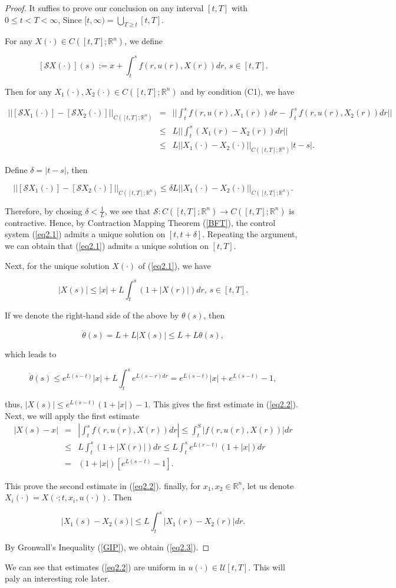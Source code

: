 \begin{proof}
It suffies to prove our conclusion on any interval $[t,T]$ with $0\leq t<T<\infty$, Since $[t,\infty)=\bigcup_{T\geq t}[t,T]$.

For any $X(\cdot)\in C([t,T];\mathbb{R}^n)$, we define

$$[\mathcal{S}X(\cdot)](s):=x+\int_{t}^{s}f(r,u(r),X(r))dr,\,s\in [t,T].$$

Then for any $X_1(\cdot),X_2(\cdot)\in C([t,T];\mathbb{R}^n)$ and by condition (C1), we have

\begin{eqnarray*}
||[\mathcal{S}X_1(\cdot)]-[\mathcal{S}X_2(\cdot)]||_{C([t,T];\mathbb{R}^n)}&=&|| \int_{t}^{s}f(r,u(r),X_1(r))dr-\int_{t}^{s}f(r,u(r),X_2(r))dr||\\
&\leq& L||\int_{t}^{s} (X_1(r)-X_2(r)) dr||\\
&\leq& L||X_1(\cdot)-X_2(\cdot)||_{C([t,T];\mathbb{R}^n)}|t-s|.
\end{eqnarray*}

Define $\delta=|t-s|$, then

$$||[\mathcal{S}X_1(\cdot)]-[\mathcal{S}X_2(\cdot)]||_{C([t,T];\mathbb{R}^n)}\leq \delta L||X_1(\cdot)-X_2(\cdot)||_{C([t,T];\mathbb{R}^n)}.$$

Therefore, by chosing $\delta<\frac{1}{L}$, we see that $\mathcal{S}: C([t,T];\mathbb{R}^n)\rightarrow C([t,T];\mathbb{R}^n)$ is contractive. Hence, by Contraction Mapping Theorem (\ref{BFT}), the control system (\ref{eq2.1}) admits a unique solution on $[t,t+\delta]$. Repeating the argument, we can obtain that (\ref{eq2.1}) admits a unique solution on $[t,T]$.

Next, for the unique solution $X(\cdot)$ of (\ref{eq2.1}), we have

$$|X(s)|\leq |x|+L\int_{t}^{s}(1+|X(r)|)dr,\, s\in [t,T].$$

If we denote the right-hand side of the above by $\theta(s)$, then

$$\dot{\theta}(s)=L+L|X(s)|\leq L+L\theta(s),$$

which leads to 

$$\dot{\theta}(s)\leq e^{L(s-t)}|x|+L\int_{t}^{s}e^{L(s-r)dr}=e^{L(s-t)}|x|+e^{L(s-t)}-1,$$

thus, $|X(s)|\leq e^{L(s-t)}(1+|x|)-1.$ This gives the first estimate in (\ref{eq2.2}). Next, we will apply the first estimate
\begin{eqnarray*}
|X(s)-x| &=& |\int_{t}^{s}f(r,u(r),X(r))dr|\leq \int_{t}^{S}|f(r,u(r),X(r))|dr\\
&\leq& L\int_{t}^{s}(1+|X(r)|)dr\leq L\int_{t}^{s}e^{L(r-t)}(1+|x|)dr\\
&=& (1+|x|)[e^{L(s-t)}-1].
\end{eqnarray*}

This prove the second estimate in (\ref{eq2.2}). finally, for $x_1,x_2\in \mathbb{R}^n$, let us denote $X_i(\cdot)=X(\cdot;t,x_i,u(\cdot))$. Then

$$|X_1(s)-X_2(s)|\leq L\int_{t}^{s} |X_1(r)-X_2(r)|dr.$$

By Gronwall's Inequality (\ref{GIP}), we obtain (\ref{eq2.3}).
\end{proof}

We can see that estimates (\ref{eq2.2}) are uniform in $u(\cdot)\in \mathcal{U}[t,T]$. This will paly an interesting role later.